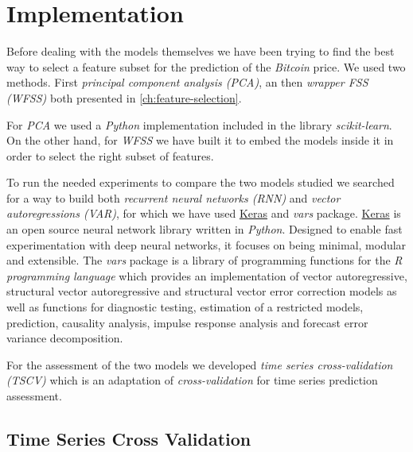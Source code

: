 
\chapter{Implementation}
\label{ch:implementation}


Before dealing with the models themselves we have been trying to find
the best way to select a feature subset for the prediction of the
\textit{Bitcoin} price. We used two methods. First \textit{principal
component analysis (PCA)}, an then \textit{wrapper FSS (WFSS)} both
presented in \autoref{ch:feature-selection}.

For \textit{PCA} we used a \textit{Python} implementation included in
the library \textit{scikit-learn}. On the other hand, for
\textit{WFSS} we have built it to embed the models inside it in order
to select the right subset of features.

To run the needed experiments to compare the two models studied we
searched for a way to build both \textit{recurrent neural networks
(RNN)} and \textit{vector autoregressions (VAR)}, for which we have
used \href{http://www.keras.io}{Keras} and \textit{vars} package.
\href{http://www.keras.io}{Keras} is an open source neural network
library written in \textit{Python}. Designed to enable fast
experimentation with deep neural networks, it focuses on being
minimal, modular and extensible. The \textit{vars} package is a
library of programming functions for the \textit{R programming
language} which provides an implementation of vector autoregressive,
structural vector autoregressive and structural vector error
correction models as well as functions for diagnostic testing,
estimation of a restricted models, prediction, causality analysis,
impulse response analysis and forecast error variance decomposition.

For the assessment of the two models we developed \textit{time series
cross-validation (TSCV)} which is an adaptation of
\textit{cross-validation} for time series prediction assessment.

\section{Time Series Cross Validation}
\label{sec:tscv}

